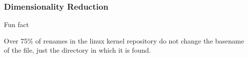 \documentclass[compress,t]{beamer}
\begin{document}

\begin{frame}
  \frametitle{Dimensionality Reduction}


    \vfill
    \begin{center}
    \begin{minipage}{0.65\textwidth}
    \begin{block}{\begin{center}Fun fact\end{center}}
        Over 75\% of renames in the linux kernel repository do not change
        the basename of the file, just the directory in which it is found.
    \end{block}
    \end{minipage}
    \end{center}
    \vfill

\end{frame}

\end{document}
